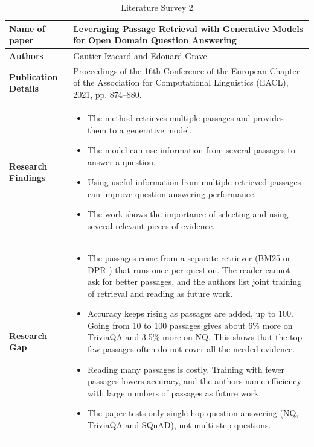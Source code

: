 \documentclass[12pt,a4paper]{report}
\begin{document}
\begin{longtable}{|p{1.25in}|p{5.15in}|}
\caption{Literature Survey 2}\label{tab:lit2}\\
\hline
\hline

\textbf{Name of paper} & Leveraging Passage Retrieval with Generative Models for Open Domain Question Answering \cite{izacard2021fid} \\ \hline

\textbf{Authors} & Gautier Izacard and Edouard Grave \\ \hline

\textbf{Publication Details} & Proceedings of the 16th Conference of the European Chapter of the Association for Computational Linguistics (EACL), 2021, pp. 874--880. \\ \hline

\textbf{Research Findings} &
\begin{itemize}[leftmargin=0.18in,itemsep=0.05in,topsep=0pt,parsep=0pt]
\item The method retrieves multiple passages and provides them to a generative model.
\item The model can use information from several passages to answer a question.
\item Using useful information from multiple retrieved passages can improve question-answering performance.
\item The work shows the importance of selecting and using several relevant pieces of evidence.
\end{itemize} \\ \hline

\textbf{Research Gap} &
\begin{itemize}[leftmargin=0.18in,itemsep=0.05in,topsep=0pt,parsep=0pt]
\item The passages come from a separate retriever (BM25 or DPR \cite{karpukhin2020dpr}) that runs once per question. The reader cannot ask for better passages, and the authors list joint training of retrieval and reading as future work. %
\item Accuracy keeps rising as passages are added, up to 100. Going from 10 to 100 passages gives about 6\% more on TriviaQA and 3.5\% more on NQ. This shows that the top few passages often do not cover all the needed evidence. %
\item Reading many passages is costly. Training with fewer passages lowers accuracy, and the authors name efficiency with large numbers of passages as future work. %
\item The paper tests only single-hop question answering (NQ, TriviaQA and SQuAD), not multi-step questions. %
\end{itemize} \\ \hline


\end{longtable}
\end{document}
